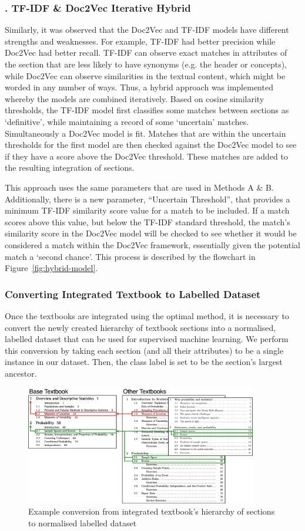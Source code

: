\documentclass[twocolumn]{article}
\newcounter{methodcounter}[section] %
\renewcommand{\themethodcounter}{\Alph{methodcounter}}
\newcommand{\method}[1]{
  \refstepcounter{methodcounter}
  \subsubsection*{\normalsize \themethodcounter. #1 \vspace{-0.5em}}
}
\newcommand{\centerimg}[1]{
  \begin{adjustbox}{center} #1 \end{adjustbox}
}
\begin{document}
\method{TF-IDF \& Doc2Vec Iterative Hybrid}
Similarly, it was observed that the Doc2Vec and TF-IDF models have different strengths and weaknesses. For example, TF-IDF had better precision while Doc2Vec had better recall. TF-IDF can observe exact matches in attributes of the section that are less likely to have synonyms (e.g. the header or concepts), while Doc2Vec can observe similarities in the textual content, which might be worded in any number of ways. Thus, a hybrid approach was implemented whereby the models are combined iteratively. Based on cosine similarity thresholds, the TF-IDF model first classifies some matches between sections as `definitive', while maintaining a record of some `uncertain' matches. Simultaneously a Doc2Vec model is fit. Matches that are within the uncertain thresholds for the first model are then checked against the Doc2Vec model to see if they have a score above the Doc2Vec threshold. These matches are added to the resulting integration of sections.

This approach uses the same parameters that are used in Methods A \& B. Additionally, there is a new parameter, ``Uncertain Threshold'', that provides a minimum TF-IDF similarity score value for a match to be included. If a match scores above this value, but below the TF-IDF standard threshold, the match's similarity score in the Doc2Vec model will be checked to see whether it would be considered a match within the Doc2Vec framework, essentially given the potential match a `second chance'. This process is described by the flowchart in Figure~\ref{fig:hybrid-model}.


\subsubsection{Converting Integrated Textbook to Labelled Dataset} \label{sec:converting-to-labelled-dataset}
Once the textbooks are integrated using the optimal method, it is necessary to convert the newly created hierarchy of textbook sections into a normalised, labelled dataset that can be used for supervised machine learning. We perform this conversion by taking each section (and all their attributes) to be a single instance in our dataset. Then, the class label is set to be the section's largest ancestor.

\begin{figure}[h!]
\caption{Example conversion from integrated textbook's hierarchy of sections to normalised labelled dataset}
\centerimg{\includegraphics[width=0.9\textwidth]{integration.png}}
\label{fig:integration}
\end{figure}
\end{document}
